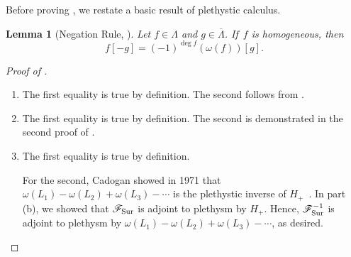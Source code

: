 \documentclass[11pt]{article}
\newtheorem{lemma}[theo]{Lemma}
\theoremstyle{definition}
\numberwithin{equation}{section}
\newcommand{\Fa}{\mathscr{F}}
\newcommand{\Sur}{\mathchoice{\operatorname{Sur}}{\operatorname{Sur}}{\mathrm{Sur}}{\mathrm{Sur}}}
\begin{document}
Before proving , we restate a basic result of plethystic calculus.
\begin{lemma}[{Negation Rule, \cite[Theorem~6]{MR2765321}}]\label{lemma:negation}
    Let $f \in \Lambda$ and $g \in \overline{\Lambda}$. If~$f$ is homogeneous, then \[f[-g] = (-1)^{\deg f} (\omega(f))[g].\]
\end{lemma}
\begin{proof}[Proof of ]
    \begin{enumerate}[label=(\alph*)]
        \item The first equality is true by definition. The second follows from .
        \item The first equality is true by definition. The second is demonstrated in the second proof of .
        \item The first equality is true by definition.
        
        For the second, Cadogan showed in 1971 that $\omega(L_1) - \omega(L_2) + \omega(L_3) - \cdots$ is the plethystic inverse of $H_+$~\cite{MR0284377}. In part (b), we showed that $\Fa_{\Sur}$ is adjoint to plethysm by $H_+$. Hence, $\Fa_{\Sur}^{-1}$ is adjoint to plethysm by $\omega(L_1) - \omega(L_2) + \omega(L_3) - \cdots$, as desired.


\end{enumerate}
\end{proof}
\end{document}
